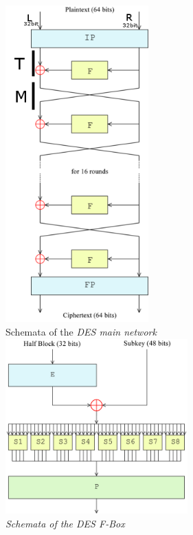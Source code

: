 \begin{minipage}{7cm}
\begin{center}
  \includegraphics[width=5.5cm]{./bilder/DES-main-network.png}\\
  Schemata of the \em DES main network \em\\
  \vspace{2mm}
  \includegraphics[width=7cm]{./bilder/DES-f-function.png}\\
  Schemata of the DES \em F-Box\em\\
 \end{center}
\end{minipage}

